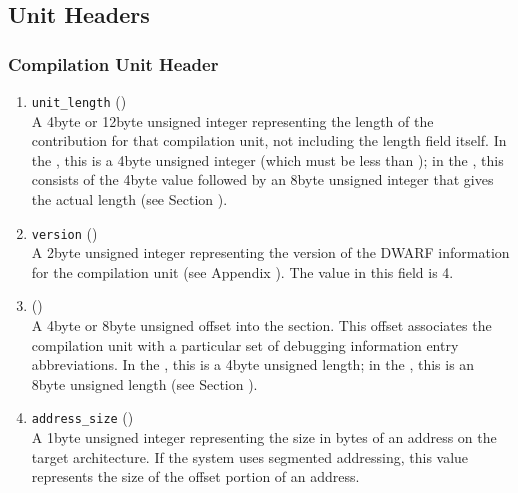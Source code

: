 \subsection{Unit Headers}
\label{datarep:unitheaders}

\subsubsection{Compilation Unit Header}
\label{datarep:compilationunitheader}
\begin{enumerate}[1. ]

\item \texttt{unit\_length} () \\
A 4\dash byte or 12\dash byte 
unsigned integer representing the length
of the \dotdebuginfo{}
contribution for that compilation unit,
not including the length field itself. In the \thirtytwobitdwarfformat,
 this is a 4\dash byte unsigned integer (which must be less
than \xfffffffzero); in the \sixtyfourbitdwarfformat, this consists
of the 4\dash byte value \wffffffff followed by an 8\dash byte unsigned
integer that gives the actual length 
(see Section ).

\item  \texttt{version} () \\
A 2\dash byte unsigned integer representing the version of the
DWARF information for the compilation unit  
(see Appendix ). 
The value in this field is 4.

\item {} () \\
A 
4\dash byte or 8\dash byte unsigned offset into the 
\dotdebugabbrev{}
section. This offset associates the compilation unit with a
particular set of debugging information entry abbreviations. In
the \thirtytwobitdwarfformat, this is a 4\dash byte unsigned length;
in the \sixtyfourbitdwarfformat, this is an 8\dash byte unsigned length
(see Section ).

\item \texttt{address\_size} () \\
A 1\dash byte unsigned integer representing the size in bytes of
an address on the target architecture. If the system uses
segmented addressing, this value represents the size of the
offset portion of an address.


\end{enumerate}

